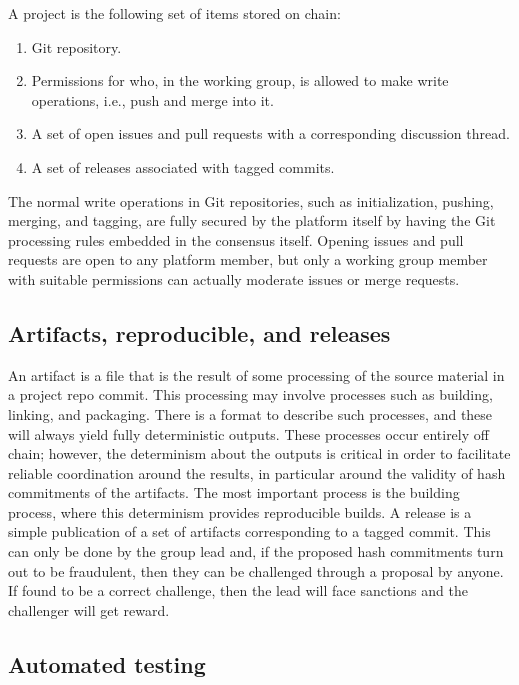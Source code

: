 \documentclass{article}
\begin{document}
A project is the following set of items stored on chain:

\begin{enumerate}
    \item Git repository.
    \item Permissions for who, in the working group, is allowed to make write operations, i.e., push and merge into it.
    \item A set of open issues and pull requests with a corresponding discussion thread.
    \item A set of releases associated with tagged commits.
\end{enumerate}

The normal write operations in Git repositories, such as initialization, pushing, merging, and tagging, are fully secured by the platform itself by having the Git processing rules embedded in the consensus itself. Opening issues and pull requests are open to any platform member, but only a working group member with suitable permissions can actually moderate issues or merge requests.

\subsection{Artifacts, reproducible, and releases}

An artifact is a file that is the result of some processing of the source material in a project repo commit. This processing may involve processes such as building, linking, and packaging. There is a format to describe such processes, and these will always yield fully deterministic outputs. These processes occur entirely off chain; however, the determinism about the outputs is critical in order to facilitate reliable coordination around the results, in particular around the validity of hash commitments of the artifacts. The most important process is the building process, where this determinism provides reproducible builds. A release is a simple publication of a set of artifacts corresponding to a tagged commit. This can only be done by the group lead and, if the proposed hash commitments turn out to be fraudulent, then they can be challenged through a proposal by anyone. If found to be a correct challenge, then the lead will face sanctions and the challenger will get reward.


\subsection{Automated testing}
\end{document}
